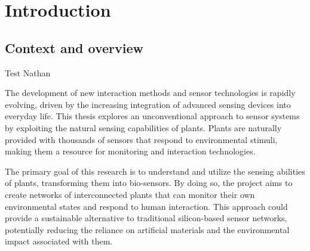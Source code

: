 \section{Introduction}




\subsection{Context and overview}

Test Nathan

The development of new interaction methods and sensor technologies is rapidly evolving, driven by the increasing integration of advanced sensing devices into everyday life. This thesis explores an unconventional approach to sensor systems by exploiting the natural sensing capabilities of plants. Plants are naturally provided with thousands of sensors that respond to environmental stimuli, making them a resource for monitoring and interaction technologies.

The primary goal of this research is to understand and utilize the sensing abilities of plants, transforming them into bio-sensors. By doing so, the project aims to create networks of interconnected plants that can monitor their own environmental states and respond to human interaction. This approach could provide a sustainable alternative to traditional silicon-based sensor networks, potentially reducing the reliance on artificial materials and the environmental impact associated with them.

